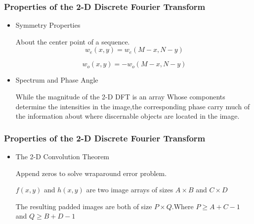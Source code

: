 \documentclass[notheorems, serif, table, compress]{beamer}  %
\begin{document}
\begin{frame}

\frametitle{Properties of the 2-D Discrete Fourier Transform}
    
\begin{itemize}

\item Symmetry Properties %

About the center point of a sequence.
\begin{equation} \label{9}
w_{e}(x,y)=w_{e}(M-x,N-y)
\end{equation}

\begin{equation} \label{10}
w_{o}(x,y)=-w_{o}(M-x,N-y)
\end{equation}
\item Spectrum and Phase Angle %


While the magnitude of the 2-D DFT is an array Whose components determine the intensities in the image,the corresponding phase carry much of the information about where discernable objects are located in the image.



\end{itemize}
\end{frame}

\begin{frame}

\frametitle{Properties of the 2-D Discrete Fourier Transform}
    
\begin{itemize}
\item The 2-D Convolution Theorem %

Append zeros to solve wraparound error problem.%

$f(x,y)$ and $h(x,y)$ are two image arrays of sizes $A\times B$ and $C\times D$ %

The resulting padded images are both of size $P\times Q$.Where $P\geq A+C-1$ and $Q\geq B+D-1$


\end{itemize}
\end{frame}
\end{document}
